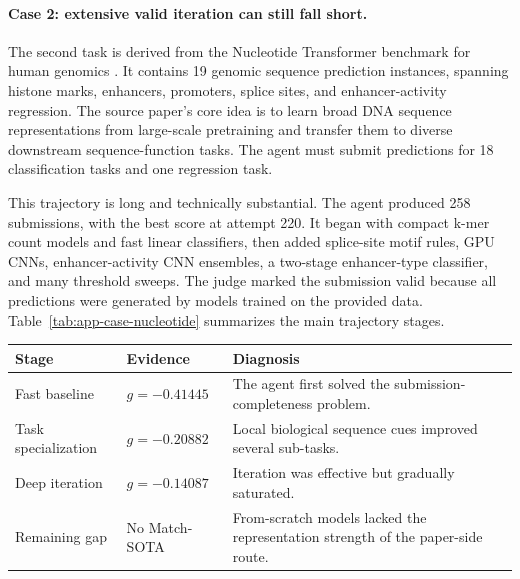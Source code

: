 \paragraph{Case 2: extensive valid iteration can still fall short.}
The second task is derived from the Nucleotide Transformer benchmark for human genomics \citep{dallatorre2025nucleotide}. It contains 19 genomic sequence prediction instances, spanning histone marks, enhancers, promoters, splice sites, and enhancer-activity regression. The source paper's core idea is to learn broad DNA sequence representations from large-scale pretraining and transfer them to diverse downstream sequence-function tasks. The agent must submit predictions for 18 classification tasks and one regression task.

This trajectory is long and technically substantial. The agent produced 258 submissions, with the best score at attempt 220. It began with compact k-mer count models and fast linear classifiers, then added splice-site motif rules, GPU CNNs, enhancer-activity CNN ensembles, a two-stage enhancer-type classifier, and many threshold sweeps. The judge marked the submission valid because all predictions were generated by models trained on the provided data.
Table~\ref{tab:app-case-nucleotide} summarizes the main trajectory stages.

\begin{center}
\begin{minipage}{\textwidth}
\label{tab:app-case-nucleotide}
\centering
\small
\begin{tabular}{@{}p{}p{}p{}@{}}
\toprule
Stage & Evidence & Diagnosis \\
\midrule
Fast baseline & $g=-0.41445$ & The agent first solved the submission-completeness problem. \\
Task specialization & $g=-0.20882$ & Local biological sequence cues improved several sub-tasks. \\
Deep iteration & $g=-0.14087$ & Iteration was effective but gradually saturated. \\
Remaining gap & No Match-SOTA & From-scratch models lacked the representation strength of the paper-side route. \\
\bottomrule
\end{tabular}
\end{minipage}
\end{center}

